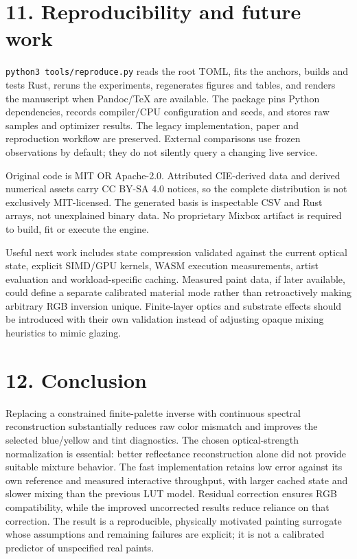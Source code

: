 \documentclass[
  10pt,
  twocolumn]{article}
\begin{document}
\hypertarget{reproducibility-and-future-work}{%
\section{11. Reproducibility and future
work}\label{reproducibility-and-future-work}}

\texttt{python3\ tools/reproduce.py} reads the root TOML, fits the
anchors, builds and tests Rust, reruns the experiments, regenerates
figures and tables, and renders the manuscript when Pandoc/TeX are
available. The package pins Python dependencies, records compiler/CPU
configuration and seeds, and stores raw samples and optimizer results.
The legacy implementation, paper and reproduction workflow are
preserved. External comparisons use frozen observations by default; they
do not silently query a changing live service.

Original code is MIT OR Apache-2.0. Attributed CIE-derived data and
derived numerical assets carry CC BY-SA 4.0 notices, so the complete
distribution is not exclusively MIT-licensed. The generated basis is
inspectable CSV and Rust arrays, not unexplained binary data. No
proprietary Mixbox artifact is required to build, fit or execute the
engine.

Useful next work includes state compression validated against the
current optical state, explicit SIMD/GPU kernels, WASM execution
measurements, artist evaluation and workload-specific caching. Measured
paint data, if later available, could define a separate calibrated
material mode rather than retroactively making arbitrary RGB inversion
unique. Finite-layer optics and substrate effects should be introduced
with their own validation instead of adjusting opaque mixing heuristics
to mimic glazing.

\hypertarget{conclusion}{%
\section{12. Conclusion}\label{conclusion}}

Replacing a constrained finite-palette inverse with continuous spectral
reconstruction substantially reduces raw color mismatch and improves the
selected blue/yellow and tint diagnostics. The chosen optical-strength
normalization is essential: better reflectance reconstruction alone did
not provide suitable mixture behavior. The fast implementation retains
low error against its own reference and measured interactive throughput,
with larger cached state and slower mixing than the previous LUT model.
Residual correction ensures RGB compatibility, while the improved
uncorrected results reduce reliance on that correction. The result is a
reproducible, physically motivated painting surrogate whose assumptions
and remaining failures are explicit; it is not a calibrated predictor of
unspecified real paints.
\end{document}
